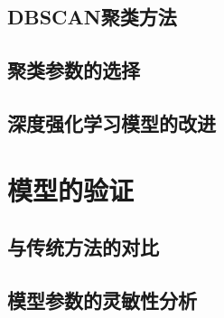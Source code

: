 \subsection{DBSCAN聚类方法}


\subsection{聚类参数的选择}

\subsection{深度强化学习模型的改进}


\section{模型的验证}

\subsection{与传统方法的对比}

\subsection{模型参数的灵敏性分析}
